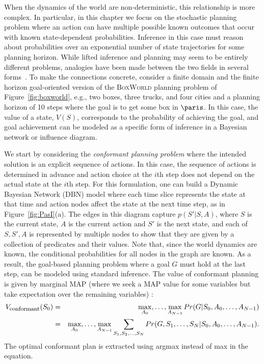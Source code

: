When the dynamics of the world are non-deterministic, this
relationship is more complex.  In particular, in this chapter we focus
on the stochastic planning problem where an action can have multiple
possible known outcomes that occur with known state-dependent
probabilities.  Inference in this case must reason about probabilities
over an exponential number of state trajectories for some
planning horizon.
%
%
%
While lifted inference and planning may seem to be entirely different
problems, analogies have been made between the two fields in several
forms~\cite{Attias03,ToussaintSt06,domshlak2006,LangTo09,FurmstonB10,LiuI12,ChengLCI13,LeeMaDe14,LeeMaDe16,issakkimuthu2015hop,MeentPTW16}.
To make the connections concrete, consider a finite domain and the finite
horizon goal-oriented version of the \textsc{BoxWorld} planning
problem of Figure~\ref{fig:boxworld}, e.g., two boxes, three trucks,
and four cities and a planning horizon of 10 steps where the goal is
to get some box in $\paris$.  In this case, 
the value of a state, $V(S)$, corresponds to the probability of
achieving the goal, and
goal achievement can be
modeled as a specific form of inference in a Bayesian network or
influence diagram.  

We start by considering the {\em conformant planning problem} where 
the intended solution is an explicit sequence of actions.
%
In this case, the sequence of actions is determined in advance and 
action choice at the $i$th step does not depend on the actual state at the $i$th step.
For this formulation,
one can build a Dynamic Bayesian Network (DBN) model where
each time slice represents the state at that time and action nodes
affect the state at the next time step, as in
Figure~\ref{fig:PasI}(a).  The edges in this diagram capture
$p(S'|S,A)$, where $S$ is the current state, $A$ is the current action
and $S'$ is the next state, and each of $S,S',A$ is represented by
multiple nodes to show that they are given by a collection of
predicates and their values.  Note that, since the world dynamics are
known, the conditional probabilities for all nodes in the graph
are known. 
As a result, 
the goal-based planning problem where a goal $G$ must hold at the last step,
can be modeled using standard
inference. The value of conformant planning is given by marginal MAP (where
we seek a MAP value for some variables but take expectation over the remaining variables)
\cite{domshlak2006,LeeMaDe14,LeeMaDe16}:
\begin{eqnarray*}
%
V_{\mbox{\footnotesize{conformant}}}(S_0) 
& = & \max_{A_0}, \ldots, \max_{A_{N-1}} 
Pr( G | S_0, A_0, \ldots, A_{N-1})  \\
& = & \max_{A_0}, \ldots, \max_{A_{N-1}} 
\sum_{S_1,S_2,\ldots,S_{N}} 
Pr( G,S_1,\ldots,S_N | S_0, A_0, \ldots, A_{N-1}). 
\end{eqnarray*}
The optimal conformant plan is extracted using
argmax instead of max in the equation.

